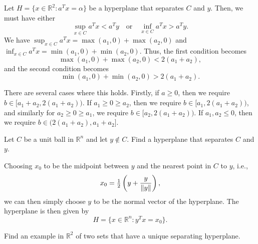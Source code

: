 \begin{solution}
  Let $H = \{ x \in \mathbb{R}^2 : a^T x = \alpha \}$ be a hyperplane that separates $C$ and $y$.
  Then, we must have either
  \begin{equation}
    \sup_{x \in C} a^T x < a^T y
    \quad\text{or}\quad
    \inf_{x \in C} a^T x > a^T y.
  \end{equation}
  We have $\sup_{x \in C} a^T x = \max(a_1, 0) + \max(a_2, 0)$ and $\inf_{x \in C} a^T x = \min(a_1, 0) + \min(a_2, 0)$.
  Thus, the first condition becomes
  \begin{equation}
    \max(a_1, 0) + \max(a_2, 0) < 2 (a_1 + a_2),
  \end{equation}
  and the second condition becomes
  \begin{equation}
    \min(a_1, 0) + \min(a_2, 0) > 2 (a_1 + a_2).
  \end{equation}

  There are several cases where this holds.
  Firstly, if $a \geq 0$, then we require $b \in [a_1 + a_2, 2 (a_1 + a_2))$. %
  If $a_1 \geq 0 \geq a_2$, then we require $b \in [a_1, 2 (a_1 + a_2))$, and similarly for $a_2 \geq 0 \geq a_1$, we require $b \in [a_2, 2 (a_1 + a_2))$. %
  If $a_1, a_2 \leq 0$, then we require $b \in (2(a_1 + a_2), a_1 + a_2]$. %
\end{solution}

\begin{exercise}
  Let $C$ be a unit ball in $\mathbb{R}^n$ and let $y \notin C$.
  Find a hyperplane that separates $C$ and $y$.
\end{exercise}

\begin{solution}
  Choosing $x_0$ to be the midpoint between $y$ and the nearest point in $C$ to $y$, i.e.,
  \begin{equation}
    x_0 = \tfrac{1}{2} \left(y + \frac{y}{\lVert y\rVert}\right),
  \end{equation}
  we can then simply choose $y$ to be the normal vector of the hyperplane.
  The hyperplane is then given by
  \begin{equation}
    H = \{ x \in \mathbb{R}^n : y^T x = x_0 \}.
  \end{equation}
\end{solution}

\begin{exercise}
  Find an example in $\mathbb{R}^2$ of two sets that have a unique separating hyperplane.
\end{exercise}

